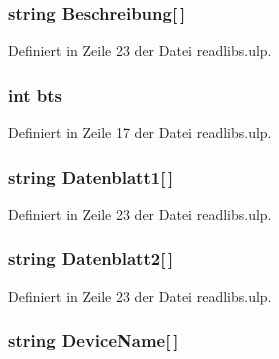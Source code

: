\subsubsection[{Beschreibung}]{\setlength{\rightskip}{0pt plus 5cm}string Beschreibung\mbox{[}$\,$\mbox{]}}\label{readlibs_8ulp_a0165df64e95135bade509c58bdb353f1}


Definiert in Zeile 23 der Datei readlibs.\+ulp.

\hypertarget{readlibs_8ulp_a00c6cb851706bdde7570b25efe80733a}{}
\subsubsection[{bts}]{\setlength{\rightskip}{0pt plus 5cm}int bts}\label{readlibs_8ulp_a00c6cb851706bdde7570b25efe80733a}


Definiert in Zeile 17 der Datei readlibs.\+ulp.

\hypertarget{readlibs_8ulp_afabb0100cbb25a94f420c30a4f376b58}{}
\subsubsection[{Datenblatt1}]{\setlength{\rightskip}{0pt plus 5cm}string Datenblatt1\mbox{[}$\,$\mbox{]}}\label{readlibs_8ulp_afabb0100cbb25a94f420c30a4f376b58}


Definiert in Zeile 23 der Datei readlibs.\+ulp.

\hypertarget{readlibs_8ulp_a658ffd52f046be63e7d0116d947c0e6f}{}
\subsubsection[{Datenblatt2}]{\setlength{\rightskip}{0pt plus 5cm}string Datenblatt2\mbox{[}$\,$\mbox{]}}\label{readlibs_8ulp_a658ffd52f046be63e7d0116d947c0e6f}


Definiert in Zeile 23 der Datei readlibs.\+ulp.

\hypertarget{readlibs_8ulp_add6cc63e92e68ae325b1ecb08776c9b9}{}
\subsubsection[{Device\+Name}]{\setlength{\rightskip}{0pt plus 5cm}string Device\+Name\mbox{[}$\,$\mbox{]}}\label{readlibs_8ulp_add6cc63e92e68ae325b1ecb08776c9b9}



